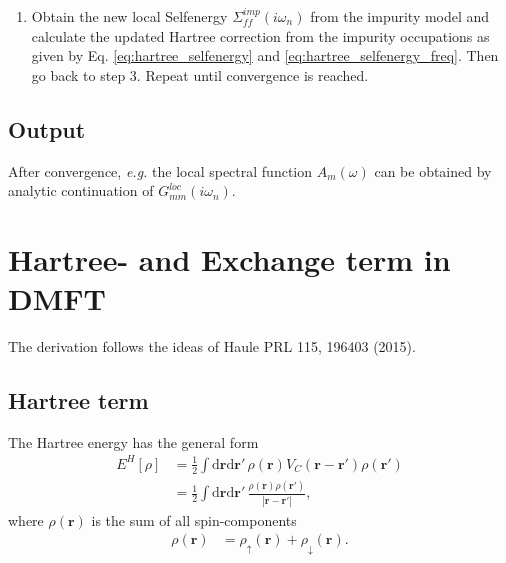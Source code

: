 \documentclass[12pt,a4paper]{scrartcl}
\numberwithin{equation}{section}
\newcommand{\GF}{Green's function}
\newcommand{\unity}{\mathds{1}}
\renewcommand{\vec}{\mathbf}
\begin{document}
\begin{enumerate}
\item Obtain the new local Selfenergy $\Sigma^{imp}_{ff}(i\omega_n)$ 
from the impurity model and calculate the updated 
Hartree correction from the impurity occupations as given by Eq. \eqref{eq:hartree_selfenergy}
and \eqref{eq:hartree_selfenergy_freq}.
Then go back to step 3. Repeat until convergence
is reached.

\end{enumerate}


\subsection{Output}
After convergence, {\it e.g.} the local spectral function $A_m(\omega)$
can be obtained by analytic continuation of $ G^{loc}_{mm}(i\omega_n) $.


\section{Hartree- and Exchange term in DMFT}
The derivation follows the ideas of Haule PRL 115, 196403 (2015).

\subsection{Hartree term}
The Hartree energy has the general form
\begin{align}
E^H[\rho]
%
&= \frac{1}{2}\int \mathrm{d}\vec{r}\mathrm{d}\vec{r}' \, 
\rho(\vec{r}) V_C(\vec{r}-\vec{r}') \rho(\vec{r}') \\
%
&= \frac{1}{2} \int \mathrm{d}\vec{r}\mathrm{d}\vec{r}' \,
\frac{\rho(\vec{r}) \rho(\vec{r}') }{|\vec{r}-\vec{r}'|},
\end{align}
where $\rho(\vec{r})$ is the sum of all spin-components
\begin{align}
\rho(\vec{r}) &= \rho_{\uparrow}(\vec{r}) + \rho_{\downarrow}(\vec{r}).
\end{align}
\end{document}
